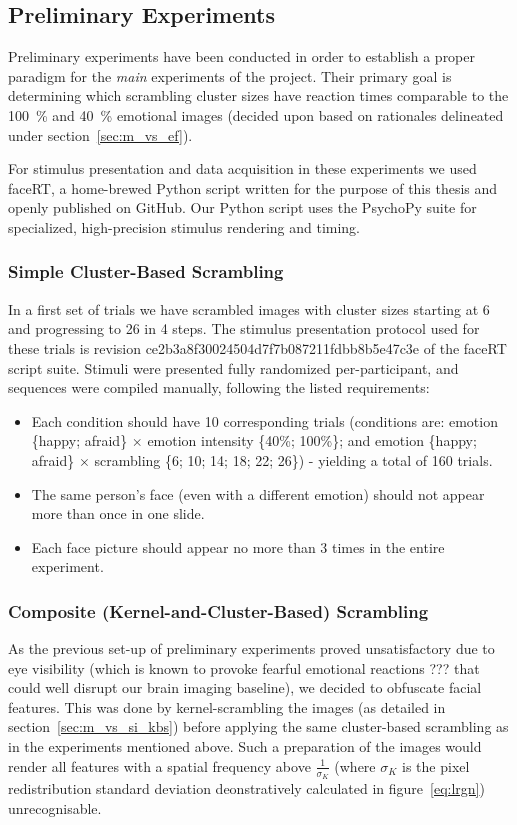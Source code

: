	\subsection{Preliminary Experiments} 
	Preliminary experiments have been conducted in order to establish a proper paradigm for the \textit{main} experiments of the project. 
	Their primary goal is determining which scrambling cluster sizes have reaction times comparable to the \SI{100}{\percent} and \SI{40}{\percent} emotional images (decided upon based on rationales delineated under section~\ref{sec:m_vs_ef}).
	
	For stimulus presentation and data acquisition in these experiments we used faceRT\cite{faceRT}, a home-brewed Python script written for the purpose of this thesis and openly published on GitHub.
	Our Python script uses the PsychoPy suite\cite{Peirce2008} for specialized, high-precision stimulus rendering and timing.   
	    \subsubsection{Simple Cluster-Based Scrambling}
	    In a first set of trials we have scrambled images with cluster sizes starting at \SI{6}{\pixel} and progressing to \SI{26}{\pixel} in \SI{4}{\pixel} steps.
	    The stimulus presentation protocol used for these trials is revision \textcolor{lg}{ce2b3a8f30024504d7f7b087211fdbb8b5e47c3e} of the faceRT\cite{faceRT} script suite.
	    Stimuli were presented fully randomized per-participant, and sequences were compiled manually, following the listed requirements:
	    \begin{itemize}
		\item Each condition should have 10 corresponding trials (conditions are: emotion \{happy; afraid\} $\times$ emotion intensity \{40\%; 100\%\}; and emotion \{happy; afraid\} $\times$ scrambling \{6; 10; 14; 18; 22; 26\}) - yielding a total of 160 trials.
		\item The same person's face (even with a different emotion) should not appear more than once in one slide.
		\item Each face picture should appear no more than 3 times in the entire experiment.
	    \end{itemize}
	    \subsubsection{Composite (Kernel-and-Cluster-Based) Scrambling}
	    As the previous set-up of preliminary experiments proved unsatisfactory due to eye visibility (which is known to provoke fearful emotional reactions ??? that could well disrupt our brain imaging baseline), we decided to obfuscate facial features.
	    This was done by kernel-scrambling the images (as detailed in section~\ref{sec:m_vs_si_kbs}) before applying the same cluster-based scrambling as in the experiments mentioned above.
	    Such a preparation of the images would render all features with a spatial frequency above $\frac{1}{\sigma_{K}}$ (where $\sigma_{K}$ is the pixel redistribution standard deviation deonstratively calculated in figure~\ref{eq:lrgn}) unrecognisable.
	    
